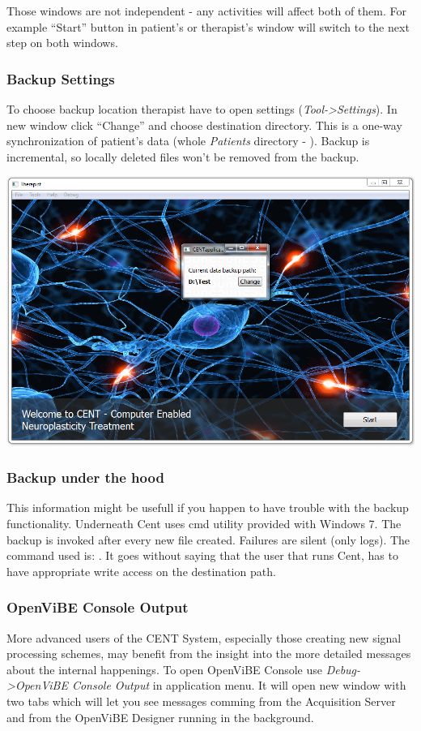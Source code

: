\documentclass[letterpaper,10pt,english]{sphinxmanual}
\begin{document}
Those windows are not independent - any activities will affect both of them. For example ``Start'' button in patient's or therapist's window will switch to the next step on both windows.


\subsubsection{Backup Settings}
\label{index:backup-settings}
To choose backup location therapist have to open settings (\emph{Tool-\textgreater{}Settings}). In new window click ``Change'' and choose destination directory. This is a one-way synchronization of patient's data (whole \emph{Patients} directory - ). Backup is incremental, so locally deleted files won't be removed from the backup.

{\hfill\includegraphics{Backup.PNG}\hfill}


\subsubsection{Backup under the hood}
\label{index:backup-under-the-hood}
This information might be usefull if you happen to have trouble with the backup functionality. Underneath Cent uses  cmd utility provided with Windows 7. The backup is invoked after every new file created. Failures are silent (only logs). The command used is: . It goes without saying that the user that runs Cent, has to have appropriate write access on the destination path.


\subsubsection{OpenViBE Console Output}
\label{index:openvibe-console-output}
More advanced users of the CENT System, especially those creating new signal processing schemes, may benefit from the insight into the more detailed messages about the internal happenings. To open OpenViBE Console use \emph{Debug-\textgreater{}OpenViBE Console Output} in application menu. It will open new window with two tabs which will let you see messages comming from the Acquisition Server and from the OpenViBE Designer running in the background.
\end{document}
